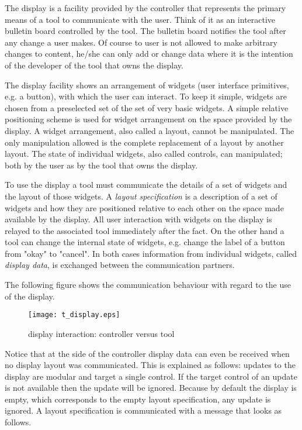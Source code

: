 \documentclass{article}
\begin{document}
   The display is a facility provided by the controller that represents the
   primary means of a tool to communicate with the user.  Think of it as an
   interactive bulletin board controlled by the tool. The bulletin board
   notifies the tool after any change a user makes. Of course to user is not
   allowed to make arbitrary changes to content, he/she can only add or change
   data where it is the intention of the developer of the tool that owns the
   display.

   The display facility shows an arrangement of widgets (user interface
   primitives, e.g. a button), with which the user can interact. To keep it 
   simple, widgets are chosen from a preselected set of the set of very basic
   widgets. A simple relative positioning scheme is used for widget arrangement
   on the space provided by the display. A widget arrangement, also called a
   layout, cannot be manipulated. The only manipulation allowed is the complete
   replacement of a layout by another layout. The state of individual widgets,
   also called controls, can manipulated; both by the user as by the tool that
   owns the display.

   To use the display a tool must communicate the details of a set of widgets
   and the layout of those widgets. A \textit{layout specification} is a
   description of a set of widgets and how they are positioned relative to each
   other on the space made available by the display. All user interaction with
   widgets on the display is relayed to the associated tool immediately after
   the fact. On the other hand a tool can change the internal state of widgets,
   e.g. change the label of a button from "okay" to "cancel". In both cases
   information from individual widgets, called \textit{display data}, is
   exchanged between the communication partners.

   The following figure shows the communication behaviour with regard to the
   use of the display.
   
   \begin{figure}[H]
    \begin{center}
     \texttt{[image: t\_display.eps]}
    \end{center}
    \vspace{-0.4cm}
    \caption{display interaction: controller versus tool}
   \end{figure}

   \noindent Notice that at the side of the controller display data can even be
   received when no display layout was communicated. This is explained as
   follows: updates to the display are modular and target a single control. If
   the target control of an update is not available then the update will be
   ignored. Because by default the display is empty, which corresponds to the
   empty layout specification, any update is ignored. A layout specification is
   communicated with a message that looks as follows.
   
\end{document}
